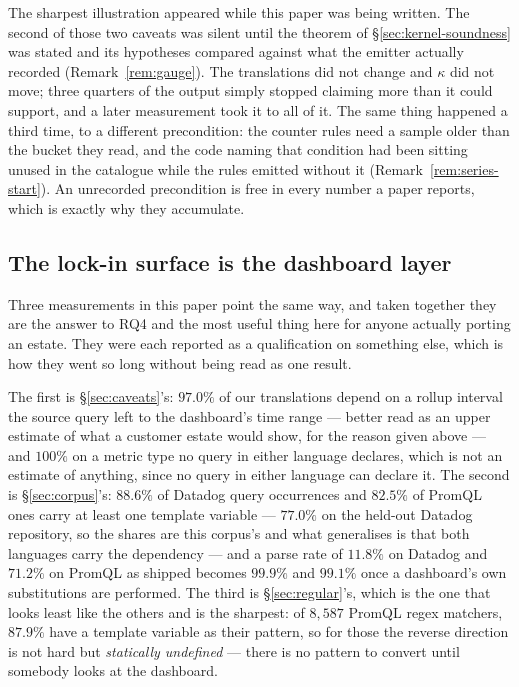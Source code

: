 The sharpest illustration appeared while this paper was being written. The second of
those two caveats was silent until the theorem of \S\ref{sec:kernel-soundness} was
stated and its hypotheses compared against what the emitter actually recorded
(Remark~\ref{rem:gauge}). The translations did not change and $\kappa$ did not move;
three quarters of the output simply stopped claiming more than it could support, and a
later measurement took it to all of it. The same thing happened a third time, to a
different precondition: the counter rules need a sample older than the bucket they read,
and the code naming that condition had been sitting unused in the catalogue while the
rules emitted without it (Remark~\ref{rem:series-start}). An unrecorded precondition is
free in every number a paper reports, which is exactly why they accumulate.

\subsection{The lock-in surface is the dashboard layer}
\label{sec:dashboard-layer}

Three measurements in this paper point the same way, and taken together they are the
answer to RQ4 and the most useful thing here for anyone actually porting an estate. They
were each reported as a qualification on something else, which is how they went so long
without being read as one result.

The first is \S\ref{sec:caveats}'s: $97.0\%$ of our translations depend on a rollup
interval the source query left to the dashboard's time range --- better read as an upper
estimate of what a customer estate would show, for the reason given above --- and
$100\%$ on a metric type no query in either language declares, which is not an estimate
of anything, since no query in either language can declare it. The second is \S\ref{sec:corpus}'s: $88.6\%$
of Datadog query occurrences and $82.5\%$ of PromQL ones carry at least one template
variable --- $77.0\%$ on the held-out Datadog repository, so the shares are this
corpus's and what generalises is that both languages carry the dependency --- and a parse rate of $11.8\%$ on Datadog and $71.2\%$ on PromQL as shipped
becomes $99.9\%$ and $99.1\%$ once a dashboard's own substitutions are performed. The
third is \S\ref{sec:regular}'s, which is the one that looks least like the others and is
the sharpest: of $8{,}587$ PromQL regex matchers, $87.9\%$ have a template variable as
their pattern, so for those the reverse direction is not hard but \emph{statically
undefined} --- there is no pattern to convert until somebody looks at the dashboard.

